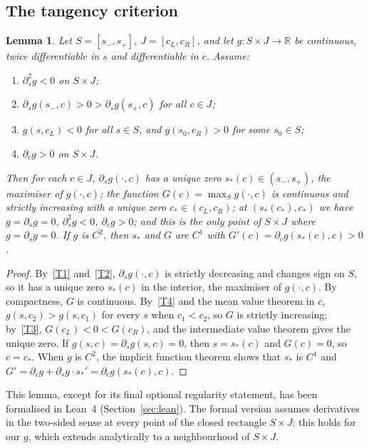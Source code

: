 \documentclass[11pt]{amsart}
\newtheorem{lemma}[thm]{Lemma}
\theoremstyle{definition}
\theoremstyle{remark}
\newcommand{\R}{\mathbb{R}}
\newcommand{\cs}{c_*}
\begin{document}
\subsection{The tangency criterion}

\begin{lemma}\label{lem:criterion}
Let $S=[s_-,s_+]$, $J=[c_L,c_R]$, and let $g\colon S\times J\to\R$ be continuous, twice differentiable in
$s$ and differentiable in $c$. Assume:
\begin{enumerate}[label=\textup{(T\arabic*)},leftmargin=*]
\item\label{T1} $\partial_s^2g<0$ on $S\times J$;
\item\label{T2} $\partial_sg(s_-,c)>0>\partial_sg(s_+,c)$ for all $c\in J$;
\item\label{T3} $g(s,c_L)<0$ for all $s\in S$, and $g(s_0,c_R)>0$ for some $s_0\in S$;
\item\label{T4} $\partial_cg>0$ on $S\times J$.
\end{enumerate}
Then for each $c\in J$, $\partial_sg(\cdot,c)$ has a unique zero $s_*(c)\in(s_-,s_+)$, the maximiser of
$g(\cdot,c)$; the function $G(c)=\max_Sg(\cdot,c)$ is continuous and strictly increasing with a unique
zero $\cs\in(c_L,c_R)$; at $(s_*(\cs),\cs)$ we have $g=\partial_sg=0$, $\partial_s^2g<0$, $\partial_cg>0$; and
this is the only point of $S\times J$ where $g=\partial_sg=0$. If $g$ is $C^2$, then $s_*$ and $G$ are $C^1$
with $G'(c)=\partial_cg(s_*(c),c)>0$.
\end{lemma}

\begin{proof}
By~\ref{T1} and~\ref{T2}, $\partial_sg(\cdot,c)$ is strictly decreasing and changes sign on $S$, so it has a
unique zero $s_*(c)$ in the interior, the maximiser of $g(\cdot,c)$. By compactness, $G$ is continuous.
By~\ref{T4} and the mean value theorem in $c$, $g(s,c_2)>g(s,c_1)$ for every $s$ when $c_1<c_2$, so $G$ is
strictly increasing; by~\ref{T3}, $G(c_L)<0<G(c_R)$, and the intermediate value theorem gives the unique
zero. If $g(s,c)=\partial_sg(s,c)=0$, then $s=s_*(c)$ and $G(c)=0$, so $c=\cs$. When $g$ is $C^2$, the
implicit function theorem shows that $s_*$ is $C^1$ and $G'=\partial_cg+\partial_sg\cdot s_*'=\partial_cg(s_*(c),c)$.
\end{proof}

This lemma, except for its final optional regularity statement, has been formalised in Lean~4
(Section~\ref{sec:lean}). The formal version assumes derivatives in the two-sided sense at every point of the
closed rectangle $S\times J$; this holds for our $g$, which extends analytically to a neighbourhood of
$S\times J$.
\end{document}

